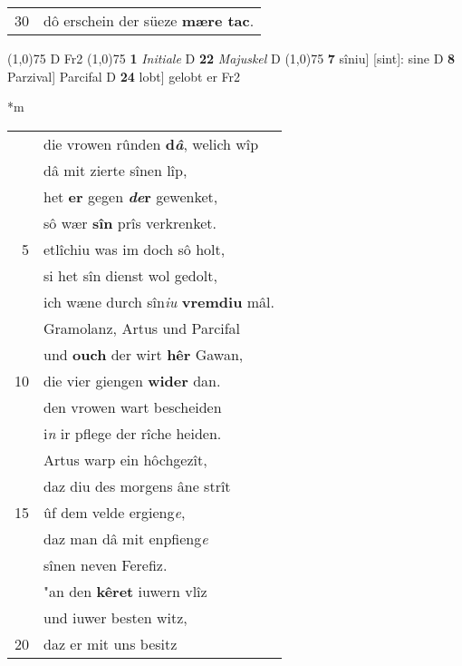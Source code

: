 \documentclass[8pt,a4paper,notitlepage]{article}
\begin{document}
\begin{table}[ht]
\begin{minipage}[t]{0.5\linewidth}
\begin{tabular}{rl}
30 & dô erschein der süeze \textbf{mære tac}.\\ 
\end{tabular}
\scriptsize
\line(1,0){75} \newline
D Fr2 \newline
\line(1,0){75} \newline
\textbf{1} \textit{Initiale} D  \textbf{22} \textit{Majuskel} D  \newline
\line(1,0){75} \newline
\textbf{7} sîniu] [sint]: sine D \textbf{8} Parzival] Parcifal D \textbf{24} lobt] gelobt er Fr2 \newline
\end{minipage}
\hspace{0.5cm}
\begin{minipage}[t]{0.5\linewidth}
\small
\begin{center}*m
\end{center}
\begin{tabular}{rl}
 & die vrowen rûnden \textbf{d\textit{â}}, welich wîp\\ 
 & dâ mit zierte sînen lîp,\\ 
 & het \textbf{er} gegen \textbf{\textit{de}r} gewenket,\\ 
 & sô wær \textbf{sîn} prîs verkrenket.\\ 
5 & etlîchiu was im doch sô holt,\\ 
 & si het sîn dienst wol gedolt,\\ 
 & ich wæne durch sîn\textit{iu} \textbf{vremdiu} mâl.\\ 
 & Gramolanz, Artus und Parcifal\\ 
 & und \textbf{ouch} der wirt \textbf{hêr} Gawan,\\ 
10 & die vier giengen \textbf{wider} dan.\\ 
 & den vrowen wart bescheiden\\ 
 & i\textit{n} ir pflege der rîche heiden.\\ 
 & Artus warp ein hôchgezît,\\ 
 & daz diu des morgens âne strît\\ 
15 & ûf dem velde ergieng\textit{e},\\ 
 & daz man dâ mit enpfieng\textit{e}\\ 
 & sînen neven Ferefiz.\\ 
 & "an den \textbf{kêret} iuwern vlîz\\ 
 & und iuwer besten witz,\\ 
20 & daz er mit uns besitz\\ 

\end{tabular}
\end{minipage}
\end{table}
\end{document}
